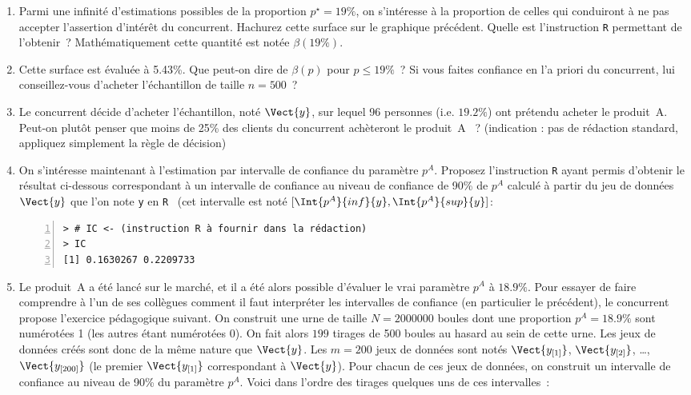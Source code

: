 \documentclass[10pt]{report}
\begin{document}
\begin{exercice}
\begin{enumerate}
\item Parmi une infinité d'estimations possibles de la proportion $p^\star=19\%$, on s'intéresse à la proportion de celles qui conduiront à ne pas accepter l'assertion d'intérêt du concurrent. Hachurez cette surface sur le graphique précédent. Quelle est l'instruction \texttt{R} permettant de l'obtenir~? Mathématiquement cette quantité est notée $\beta(19\%)$.



\item Cette surface est évaluée à 5.43\%. Que peut-on dire de $\beta(p)$ pour $p\leq 19\%$~? Si vous faites confiance en l'a priori du concurrent, lui conseillez-vous d'acheter l'échantillon de taille $n=500$~?



\item Le concurrent décide d'acheter l'échantillon, noté $\Vect{y}$, sur lequel 96 personnes (i.e. $19.2\%$) ont prétendu acheter le produit~A. Peut-on plutôt penser que moins de 25\% des clients du concurrent achèteront le produit~A ~? (indication : pas de rédaction standard, appliquez simplement la règle de décision)



\item On s'intéresse maintenant à l'estimation par intervalle de confiance du paramètre $p^A$. Proposez l'instruction \texttt{R} ayant permis d'obtenir le résultat ci-dessous correspondant à un intervalle de confiance au niveau de confiance de 90\% de $p^A$ calculé à partir du jeu de données $\Vect{y}$ que l'on note \texttt{y} en \texttt{R}~ (cet intervalle est noté $[\Int{p^A}{inf}{y} , \Int{p^A}{sup}{y} ]$:

\IndicR
\begin{Verbatim}[frame=leftline,fontfamily=tt,fontshape=n,numbers=left]
> # IC <- (instruction R à fournir dans la rédaction)
> IC
[1] 0.1630267 0.2209733
\end{Verbatim}




\item Le produit~A a été lancé sur le marché, et il a été alors possible d'évaluer le vrai paramètre $p^A$ à $18.9\%$. Pour essayer de faire comprendre à l'un de ses collègues comment il faut interpréter les intervalles de confiance (en particulier le précédent), le concurrent propose l'exercice pédagogique suivant. On construit une urne de taille $N=2000000$ boules dont une proportion $p^A=18.9\%$ sont numérotées 1 (les autres étant numérotées 0). On fait alors $199$ tirages de 500 boules au hasard au sein de cette urne. Les jeux de données créés sont donc de la même nature que $\Vect{y}$. Les $m=200$ jeux de données sont notés $\Vect{y_{[1]}}$, $\Vect{y_{[2]}}$, \ldots, $\Vect{y_{[200]}}$ (le premier $\Vect{y_{[1]}}$ correspondant à $\Vect{y}$). Pour chacun de ces jeux de données, on construit un intervalle de confiance au niveau de 90\% du paramètre $p^A$. 
Voici dans l'ordre des tirages quelques uns de ces intervalles~:



\end{enumerate}
\end{exercice}
\end{document}
